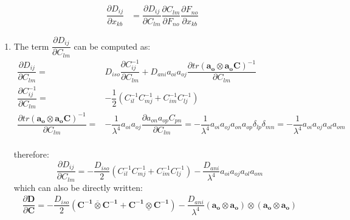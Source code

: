 \documentclass[oneside,11pt,times]{book}
\begin{document}
\begin{equation}
    \begin{aligned}
        \dfrac{\partial{D_{ij}}}{\partial{x_{kb}}}&=\dfrac{\partial{D_{ij}}}{\partial{C_{lm}}}\dfrac{\partial{C_{lm}}}{\partial{F_{no}}}\dfrac{\partial{F_{no}}}{\partial{x_{kb}}}
    \end{aligned}
    \label{equation:dDijdxkbDef}
\end{equation}
\begin{enumerate}
    \item The term $\dfrac{\partial{D_{ij}}}{\partial{C_{lm}}}$ can be computed as:
        \begin{equation}
            \begin{aligned}
                \dfrac{\partial{D_{ij}}}{\partial{C_{lm}}}=& D_{iso}\dfrac{\partial{C^{-1}_{ij}}}{\partial{C_{lm}}}+D_{ani}a_{oi}a_{oj}\dfrac{\partial{tr(\bm{a_{o}\otimes a_{o}C})^{-1}}}{\partial{C_{lm}}}\\
                \dfrac{\partial{C^{-1}_{ij}}}{\partial{C_{lm}}}=& -\dfrac{1}{2}\left(C^{-1}_{il}C^{-1}_{mj}+C^{-1}_{im}C^{-1}_{lj}\right)\\
                \dfrac{\partial{tr(\bm{a_{o}\otimes a_{o}C})^{-1}}}{\partial{C_{lm}}}=& -\dfrac{1}{\lambda^{4}}a_{oi}a_{oj}\dfrac{\partial{a_{on}a_{op}C_{pn}}}{\partial{C_{lm}}}=-\dfrac{1}{\lambda^{4}}a_{oi}a_{oj}a_{on}a_{op}\delta_{lp}\delta_{mn}=-\dfrac{1}{\lambda^{4}}a_{oi}a_{oj}a_{ol}a_{om}
            \end{aligned}
            \label{equation:dDijdClm1}
        \end{equation}
        \\
        therefore:
        \begin{equation}
            \dfrac{\partial{D_{ij}}}{\partial{C_{lm}}}=-\dfrac{D_{iso}}{2}\left(C^{-1}_{il}C^{-1}_{mj}+C^{-1}_{im}C^{-1}_{lj}\right)-\dfrac{D_{ani}}{\lambda^{4}}a_{oi}a_{oj}a_{ol}a_{om}
            \label{equation:dDijdClm2}
        \end{equation}
        which can also be directly written:
        \begin{equation}
            \begin{aligned}
                \dfrac{\partial{\bm{D}}}{\partial{\bm{C}}}=-\dfrac{D_{iso}}{2}\left(\bm{C^{-1}}\overline{\otimes}\bm{C^{-1}}+\bm{C^{-1}}\underline{\otimes}\bm{C^{-1}}\right)-\dfrac{D_{ani}}{\lambda^{4}}\left(\bm{a_{o}}\otimes\bm{a_{o}}\right)\otimes\left(\bm{a_{o}}\otimes\bm{a_{o}}\right)
            \end{aligned}

\end{equation}
\end{enumerate}
\end{document}
